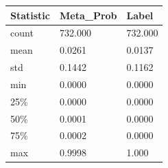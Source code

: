 \begin{tabular}{lll}
\toprule
Statistic & Meta\_Prob & Label \\
\midrule
count & 732.000 & 732.000 \\
mean & 0.0261 & 0.0137 \\
std & 0.1442 & 0.1162 \\
min & 0.0000 & 0.0000 \\
25\% & 0.0000 & 0.0000 \\
50\% & 0.0001 & 0.0000 \\
75\% & 0.0002 & 0.0000 \\
max & 0.9998 & 1.000 \\
\bottomrule
\end{tabular}